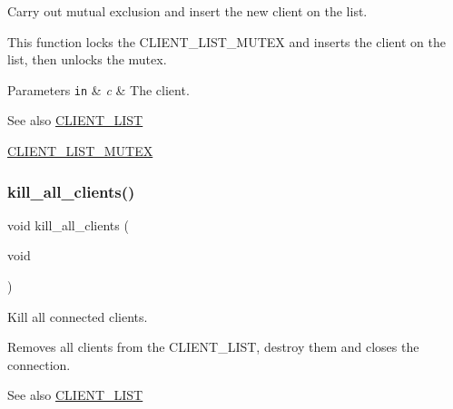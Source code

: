 Carry out mutual exclusion and insert the new client on the list. 

This function locks the {\ttfamily C\+L\+I\+E\+N\+T\+\_\+\+L\+I\+S\+T\+\_\+\+M\+U\+T\+EX} and inserts the client on the list, then unlocks the mutex.


\begin{DoxyParams}[1]{Parameters}
\mbox{\tt in}  & {\em c} & The client.\\
\hline
\end{DoxyParams}
\begin{DoxySeeAlso}{See also}
\hyperlink{zip-zop-server_8c_a32076dcdfaf1057a014d74d01cc7e08e}{C\+L\+I\+E\+N\+T\+\_\+\+L\+I\+ST} 

\hyperlink{zip-zop-server_8c_ac58873310e66c9bfafdbc798a8a7c7e2}{C\+L\+I\+E\+N\+T\+\_\+\+L\+I\+S\+T\+\_\+\+M\+U\+T\+EX} 
\end{DoxySeeAlso}
\mbox{\label{zip-zop-server_8c_ae3219dbffc65a1b8e1f4170f205f647a}} 
\subsubsection{\texorpdfstring{kill\+\_\+all\+\_\+clients()}{kill\_all\_clients()}}
{\footnotesize\ttfamily void kill\+\_\+all\+\_\+clients (\begin{DoxyParamCaption}\item[{void}]{ }\end{DoxyParamCaption})}



Kill all connected clients. 

Removes all clients from the {\ttfamily C\+L\+I\+E\+N\+T\+\_\+\+L\+I\+ST}, destroy them and closes the connection.

\begin{DoxySeeAlso}{See also}
\hyperlink{zip-zop-server_8c_a32076dcdfaf1057a014d74d01cc7e08e}{C\+L\+I\+E\+N\+T\+\_\+\+L\+I\+ST} 
\end{DoxySeeAlso}
\mbox{\label{zip-zop-server_8c_ae5845d7e65c1c7407d1df63105450b5e}} 
